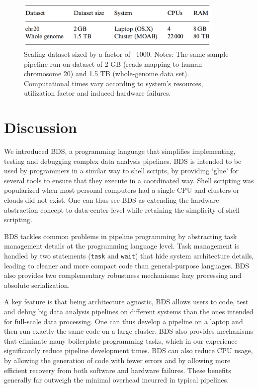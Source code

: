 \begin{figure}
    \centering
    \includegraphics[width=10cm]{bds_table_2.png}
    \caption{Scaling dataset sized by a factor of ~1000. Notes: The same sample pipeline run on dataset of 2 GB (reads mapping to human chromosome 20) and 1.5 TB (whole-genome data set). Computational times vary according to system’s resources, utilization factor and induced hardware failures.}
    \label{fig:bdstablescale}
\end{figure}


\section{Discussion}

We introduced BDS, a programming language that simplifies implementing, testing and debugging complex data analysis pipelines. BDS is intended to be used by programmers in a similar way to shell scripts, by providing ‘glue’ for several tools to ensure that they execute in a coordinated way. Shell scripting was popularized when most personal computers had a single CPU and clusters or clouds did not exist. One can thus see BDS as extending the hardware abstraction concept to data-center level while retaining the simplicity of shell scripting.

BDS tackles common problems in pipeline programming by abstracting task management details at the programming language level. Task management is handled by two statements (\texttt{task} and \texttt{wait}) that hide system architecture details, leading to cleaner and more compact code than general-purpose languages. BDS also provides two complementary robustness mechanisms: lazy processing and absolute serialization.

A key feature is that being architecture agnostic, BDS allows users to code, test and debug big data analysis pipelines on different systems than the ones intended for full-scale data processing. One can thus develop a pipeline on a laptop and then run exactly the same code on a large cluster. BDS also provides mechanisms that eliminate many boilerplate programming tasks, which in our experience significantly reduce pipeline development times. BDS can also reduce CPU usage, by allowing the generation of code with fewer errors and by allowing more efficient recovery from both software and hardware failures. These benefits generally far outweigh the minimal overhead incurred in typical pipelines.

